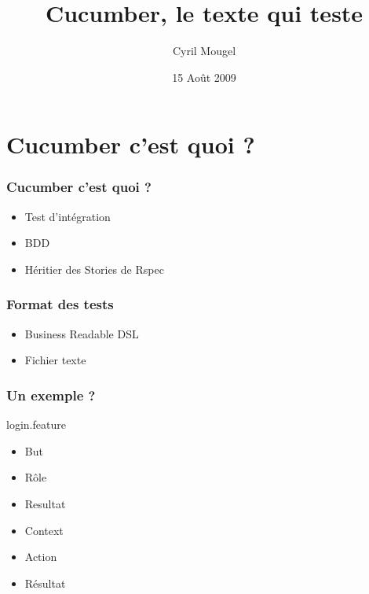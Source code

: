 \documentclass{beamer}
\title{Cucumber, le texte qui teste}
\author{Cyril Mougel}
\date{15 Août 2009}
\begin{document}
\begin{frame}
    \titlepage
\end{frame}

\section{Cucumber c'est quoi ?}

\begin{frame}
	\frametitle{Cucumber c'est quoi ?}
	\begin{itemize}
    \item Test d'intégration
    \item BDD
    \item Héritier des Stories de Rspec
	\end{itemize}
\end{frame}

\begin{frame}
  \frametitle{Format des tests}
  \begin{itemize}
    \item Business Readable DSL
    \item Fichier texte
  \end{itemize}
\end{frame}

\begin{frame}
  \frametitle{Un exemple ?}
  \begin{beamerboxesrounded}{login.feature}
    
  \end{beamerboxesrounded}
\end{frame}

\begin{frame}
  \begin{itemize}
    \item But
    \item Rôle
    \item Resultat
  \end{itemize}
\end{frame}

\begin{frame}
  \begin{itemize}
    \item Context
    \item Action
    \item R\'esultat
  \end{itemize}
\end{frame}
\end{document}

